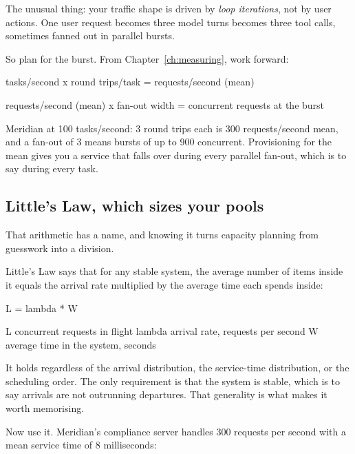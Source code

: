 The unusual thing: your traffic shape is driven by \emph{loop iterations}, not by
user actions. One user request becomes three model turns becomes three tool
calls, sometimes fanned out in parallel bursts.

So plan for the burst. From Chapter~\ref{ch:measuring}, work forward:

\begin{plain}
tasks/second                    x  round trips/task
                                =  requests/second (mean)

requests/second (mean)          x  fan-out width
                                =  concurrent requests at the burst
\end{plain}

Meridian at 100 tasks/second: 3 round trips each is 300 requests/second mean,
and a fan-out of 3 means bursts of up to 900 concurrent. Provisioning for the
mean gives you a service that falls over during every parallel fan-out, which is
to say during every task.


\subsection{Little's Law, which sizes your pools}

That arithmetic has a name, and knowing it turns capacity planning from
guesswork into a division.

Little's Law says that for any stable system, the average number of items inside
it equals the arrival rate multiplied by the average time each spends inside:

\begin{plain}
L = lambda * W

L       concurrent requests in flight
lambda  arrival rate, requests per second
W       average time in the system, seconds
\end{plain}

It holds regardless of the arrival distribution, the service-time distribution,
or the scheduling order. The only requirement is that the system is stable, which
is to say arrivals are not outrunning departures. That generality is what makes
it worth memorising.

Now use it. Meridian's compliance server handles 300 requests per second with a
mean service time of 8 milliseconds:

